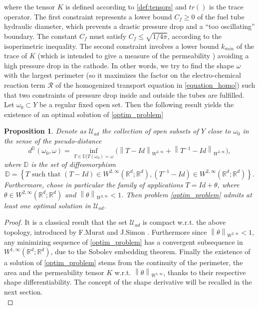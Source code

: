 \documentclass{article}
\newtheorem{prop}[thm]{Proposition}
\def\Uadmis{{\mathcal U}_{ad}}
\newcommand{\Rbb} {\mathbb{R}}
\begin{document}
where the tensor $K$ is defined according to \eqref{def:tensors} and $tr()$ is the trace operator. The first constraint represents a lower bound $C_f\geq 0$ of the fuel tube hydraulic diameter, which prevents a drastic pressure drop and a ``too oscillating'' boundary. The constant $C_f$ must satisfy $C_f\leq \sqrt{1/4\pi}$, according to the  isoperimetric inequality. The second constraint involves a lower bound $k_{min}$ of the trace of $K$ (which is intended to give a {measure} of the permeability \cite{guest2007design}) avoiding a high pressure drop in the cathode. In other words, we try to find the shape $\omega$ with the largest perimeter (so it maximizes the factor on the electro-chemical reaction term $\mathcal{R}$ of the homogenized transport equation in \eqref{equation_homo}) such that two constraints of pressure drop inside and outside the tubes are fulfilled.\\

Let $\omega_0\subset Y$ be a regular fixed open set. Then the following result yields the existence of an optimal solution of \eqref{optim_problem}
\begin{prop}
Denote as $\Uadmis$ the collection of open subsets of $Y$ close to $\omega_0$ in the sense of the pseudo-distance
\begin{equation*}
d^{\mathbb{D}}(\omega_0,\omega)= \inf \limits_{T\in \mathbb{D}| T(\omega_0)=\omega}\Big(\left\|T-Id\right\|_{W^{2,\infty}}+ \left\|T^{-1}-Id\right\|_{W^{2,\infty}}\Big),
\end{equation*}
where $\mathbb{D}$ is the set of diffeomorphism 
\begin{equation*}
\mathbb{D}= \left\{T \mbox{ such that }(T-Id)\in W^{2,\infty}(\Rbb^d;\Rbb^d),(T^{-1}-Id)\in W^{2,\infty}(\Rbb^d;\Rbb^d)  \right\}.
\end{equation*}
Furthermore, chose in particular the family of applications $T=Id+\theta$, where $\theta \in W^{2,\infty}(\Rbb^d;\Rbb^d)$ and $\left\|\theta \right\|_{W^{2,\infty}}<1$. Then problem \eqref{optim_problem} admits at least one optimal solution in $\Uadmis$.

\end{prop}
\begin{proof}
It is a classical result that the set $\Uadmis$ is compact w.r.t. the above topology, introduced by F.Murat and J.Simon \cite{murat1974quelques}. Furthermore since $\left\|\theta \right\|_{W^{2,\infty}}<1$, any minimizing sequence of \eqref{optim_problem} has a convergent subsequence in $W^{1,\infty}(\Rbb^d;\Rbb^d)$, due to the Sobolev embedding theorem. Finally the existence of a solution of \eqref{optim_problem} stems from the continuity of the perimeter, the area and the permeability tensor $K$ w.r.t. $\left\|\theta\right\|_{W^{1,\infty}}$, thanks to their respective shape differentiability. The concept of the shape derivative will be recalled in the next section.\\ \end{proof}
\end{document}
